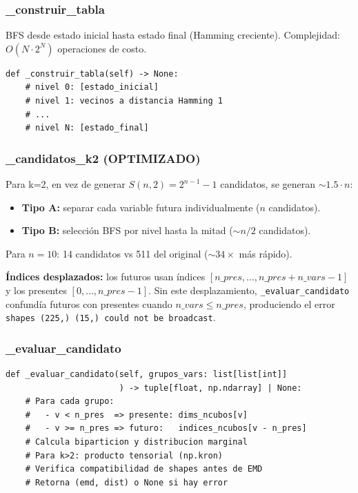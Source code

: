 \documentclass[12pt,a4paper]{article}
\begin{document}
\subsubsection{\_construir\_tabla}
BFS desde estado inicial hasta estado final (Hamming creciente). Complejidad: $O(N \cdot 2^N)$ operaciones de costo.

\begin{lstlisting}
def _construir_tabla(self) -> None:
    # nivel 0: [estado_inicial]
    # nivel 1: vecinos a distancia Hamming 1
    # ...
    # nivel N: [estado_final]
\end{lstlisting}

\subsubsection{\_candidatos\_k2 (OPTIMIZADO)}

\begin{optbox}
Para k=2, en vez de generar $S(n,2) = 2^{n-1}-1$ candidatos, se generan $\sim 1.5 \cdot n$:
\begin{itemize}
    \item \textbf{Tipo A:} separar cada variable futura individualmente ($n$ candidatos).
    \item \textbf{Tipo B:} selección BFS por nivel hasta la mitad ($\sim n/2$ candidatos).
\end{itemize}
Para $n=10$: 14 candidatos vs 511 del original ($\sim 34\times$ más rápido).
\end{optbox}

\begin{bugbox}
\textbf{Índices desplazados:} los futuros usan índices $[n\_pres, \ldots, n\_pres + n\_vars - 1]$ y los presentes $[0, \ldots, n\_pres-1]$. Sin este desplazamiento, \texttt{\_evaluar\_candidato} confundía futuros con presentes cuando $n\_vars \leq n\_pres$, produciendo el error \texttt{shapes (225,) (15,) could not be broadcast}.
\end{bugbox}

\subsubsection{\_evaluar\_candidato}
\begin{lstlisting}
def _evaluar_candidato(self, grupos_vars: list[list[int]]
                       ) -> tuple[float, np.ndarray] | None:
    # Para cada grupo:
    #   - v < n_pres  => presente: dims_ncubos[v]
    #   - v >= n_pres => futuro:   indices_ncubos[v - n_pres]
    # Calcula biparticion y distribucion marginal
    # Para k>2: producto tensorial (np.kron)
    # Verifica compatibilidad de shapes antes de EMD
    # Retorna (emd, dist) o None si hay error
\end{lstlisting}
\end{document}
